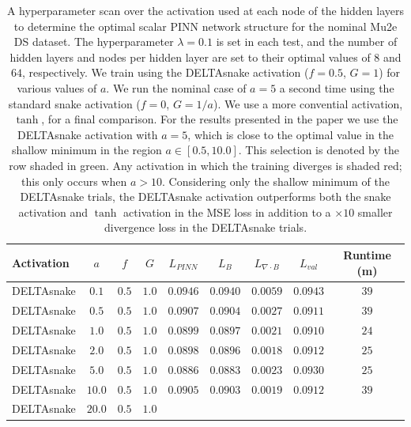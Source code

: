 \begin{table}[htbp!]
\center
\caption{A hyperparameter scan over the activation used at each node of the hidden layers to determine the optimal scalar 
PINN network structure for the nominal Mu2e DS dataset.
The hyperparameter $\lambda=0.1$ is set in each test, and the number of hidden layers and nodes per hidden layer are set to their
optimal values of $8$ and $64$, respectively. We train using the DELTAsnake activation ($f=0.5$, $G=1$) for various values of $a$. We
run the nominal case of $a=5$ a second time using the standard snake activation ($f=0$, $G=1/a$). 
We use a more convential activation, $\tanh$, for a final comparison. For the results presented in the paper
we use the DELTAsnake activation with $a=5$, which is close to the optimal value in the shallow minimum in the region $a \in [0.5, 10.0]$.
This selection is denoted by the row shaded in green.
Any activation in which the training diverges is shaded red; this only occurs when $a>10$. Considering only the shallow minimum of the
DELTAsnake trials, the DELTAsnake activation outperforms both the snake activation and $\tanh$ activation in the MSE loss in addition to
a $\times 10$ smaller divergence loss in the DELTAsnake trials.}
\begin{tabular}{l|c|c|c||c|c|c|c|c}
Activation & $a$ & $f$ & $G$ & $L_{PINN}$ & $L_B$ & $L_{\nabla \cdot B}$ & $L_{val}$ & Runtime (m) \\\hline
 DELTAsnake &  $0.1$ &  $0.5$ &  $1.0$ & $0.0946$ & $0.0940$ & $0.0059$ & $0.0943$ & $39$\\
\hline
 DELTAsnake &  $0.5$ &  $0.5$ &  $1.0$ & $0.0907$ & $0.0904$ & $0.0027$ & $0.0911$ & $39$\\
\hline
 DELTAsnake &  $1.0$ &  $0.5$ &  $1.0$ & $0.0899$ & $0.0897$ & $0.0021$ & $0.0910$ & $24$\\
\hline
 DELTAsnake &  $2.0$ &  $0.5$ &  $1.0$ & $0.0898$ & $0.0896$ & $0.0018$ & $0.0912$ & $25$\\
\hline
\cellcolor{green!30} DELTAsnake & \cellcolor{green!30} $5.0$ & \cellcolor{green!30} $0.5$ & \cellcolor{green!30} $1.0$ & \cellcolor{green!30}\cellcolor{green!30}$0.0886$ &\cellcolor{green!30} $0.0883$ &\cellcolor{green!30} $0.0023$ &\cellcolor{green!30} $0.0930$ &\cellcolor{green!30} $25$\\
\hline
 DELTAsnake &  $10.0$ &  $0.5$ &  $1.0$ & $0.0905$ & $0.0903$ & $0.0019$ & $0.0912$ & $39$\\
\hline
 \cellcolor{red!30} DELTAsnake &  \cellcolor{red!30} $20.0$ &  \cellcolor{red!30} $0.5$ &  \cellcolor{red!30} $1.0$ &  \cellcolor{red!30} \cellcolor{red!30}$\ $ & \cellcolor{red!30} $\ $ & \cellcolor{red!30} $\ $ & \cellcolor{red!30} $\ $ & \cellcolor{red!30} $\ $\\

\end{tabular}
\end{table}
